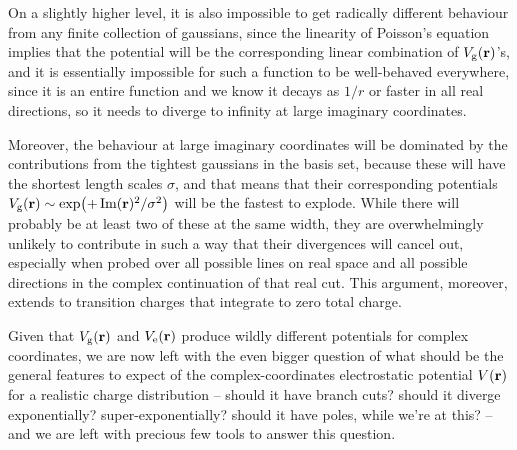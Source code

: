 On a slightly higher level, it is also impossible to get radically different behaviour from any finite collection of gaussians, since the linearity of Poisson's equation implies that the potential will be the corresponding linear combination of $V_\mathrm{g}(\vb{r})$'s, and it is essentially impossible for such a function to be well-behaved everywhere, since it is an entire function and we know it decays as $1/r$ or faster in all real directions, so it needs to diverge to infinity at large imaginary coordinates. 

Moreover, the behaviour at large imaginary coordinates will be dominated by the contributions from the tightest gaussians in the basis set, because these will have the shortest length scales $\sigma$, and that means that their corresponding potentials $V_\mathrm{g}(\vb{r})\sim \exp(+\Im(\vb{r})^2/\sigma^2)$ will be the fastest to explode. While there will probably be at least two of these at the same width, they are overwhelmingly unlikely to contribute in such a way that their divergences will cancel out, especially when probed over all possible lines on real space and all possible directions in the complex continuation of that real cut.  This argument, moreover, extends to transition charges that integrate to zero total charge.



Given that $V_\mathrm{g}(\vb{r})$ and $V_\mathrm{e}(\vb{r})$ produce wildly different potentials for complex coordinates, we are now left with the even bigger question of what should be the general features to expect of the complex-coordinates electrostatic potential $V(\vb{r})$ for a realistic charge distribution -- should it have branch cuts? should it diverge exponentially? super-exponentially? should it have poles, while we're at this? -- and we are left with precious few tools to answer this question.



